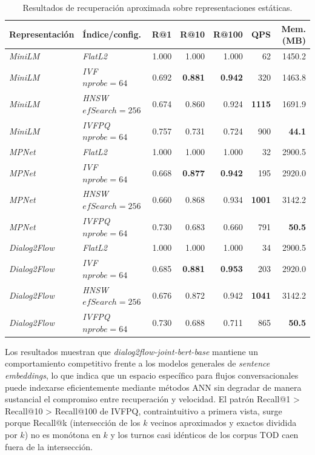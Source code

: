 \documentclass[runningheads]{llncs}
\begin{document}
\begin{table}[ht]
\centering
\small
\setlength{\tabcolsep}{4pt}
\caption{Resultados de recuperación aproximada sobre representaciones estáticas.}
\label{tab:static_representative}
\begin{tabular}{llrrrrr}
\toprule
Representación & Índice/config. & R@1 & R@10 & R@100 & QPS & Mem. (MB) \\
\midrule
\textit{MiniLM} & \textit{FlatL2} & 1.000 & 1.000 & 1.000 & 62 & 1450.2 \\
\textit{MiniLM} & \textit{IVF} $nprobe=64$ & 0.692 & \textbf{0.881} & \textbf{0.942} & 320 & 1463.8 \\
\textit{MiniLM} & \textit{HNSW} $efSearch=256$ & 0.674 & 0.860 & 0.924 & \textbf{1115} & 1691.9 \\
\textit{MiniLM} & \textit{IVFPQ} $nprobe=64$ & 0.757 & 0.731 & 0.724 & 900 & \textbf{44.1} \\
\midrule
\textit{MPNet} & \textit{FlatL2} & 1.000 & 1.000 & 1.000 & 32 & 2900.5 \\
\textit{MPNet} & \textit{IVF} $nprobe=64$ & 0.668 & \textbf{0.877} & \textbf{0.942} & 195 & 2920.0 \\
\textit{MPNet} & \textit{HNSW} $efSearch=256$ & 0.660 & 0.868 & 0.934 & \textbf{1001} & 3142.2 \\
\textit{MPNet} & \textit{IVFPQ} $nprobe=64$ & 0.730 & 0.683 & 0.660 & 791 & \textbf{50.5} \\
\midrule
\textit{Dialog2Flow} & \textit{FlatL2} & 1.000 & 1.000 & 1.000 & 34 & 2900.5 \\
\textit{Dialog2Flow} & \textit{IVF} $nprobe=64$ & 0.685 & \textbf{0.881} & \textbf{0.953} & 203 & 2920.0 \\
\textit{Dialog2Flow} & \textit{HNSW} $efSearch=256$ & 0.676 & 0.872 & 0.942 & \textbf{1041} & 3142.2 \\
\textit{Dialog2Flow} & \textit{IVFPQ} $nprobe=64$ & 0.730 & 0.688 & 0.711 & 865 & \textbf{50.5} \\
\bottomrule
\end{tabular}
\end{table}

Los resultados muestran que \textit{dialog2flow-joint-bert-base} mantiene un comportamiento competitivo frente a los modelos generales de \textit{sentence embeddings}, lo que indica que un espacio específico para flujos conversacionales puede indexarse eficientemente mediante métodos ANN sin degradar de manera sustancial el compromiso entre recuperación y velocidad. El patrón Recall@1 > Recall@10 > Recall@100 de IVFPQ, contraintuitivo a primera vista, surge porque Recall@k (intersección de los $k$ vecinos aproximados y exactos dividida por $k$) no es monótona en $k$ y los turnos casi idénticos de los corpus TOD caen fuera de la intersección.
\end{document}
